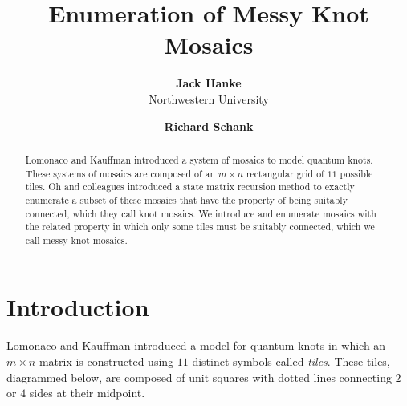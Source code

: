 \documentclass[12pt]{article}
\date{}
\author{
    \textbf{Jack Hanke}\\
    Northwestern University
    \and
    \textbf{Richard Schank}\\
    }
\title{\textbf{Enumeration of Messy Knot Mosaics}}
\theoremstyle{plain}
\theoremstyle{definition}
\theoremstyle{remark}
\theoremstyle{definition}
\newcommand{\cell}[4]{ \draw[thick] ( #1 , #2 ) rectangle ( #3 , #4 );}
\newcommand{\cellA}[4]{\draw[red, thick, densely dotted] ( #1 + 0.5 , #2 ) arc(0:90:{0.5}); \draw[thick] ( #1 , #2 ) rectangle ( #3 , #4 );}
\newcommand{\cellB}[4]{\draw[red, thick, densely dotted] ( #1 + 1 , #2 + 0.5 ) arc(90:180:{0.5}); \draw[thick] ( #1 , #2 ) rectangle ( #3 , #4 );}
\newcommand{\cellC}[4]{\draw[red, thick, densely dotted] ( #1 + 0.5, #2 + 1 ) arc(180:270:{0.5}); \draw[thick] ( #1 , #2 ) rectangle ( #3 , #4 );}
\newcommand{\cellD}[4]{\draw[red, thick, densely dotted] ( #1 , #2 + 0.5 ) arc(-90:0:{0.5}); \draw[thick] ( #1 , #2 ) rectangle ( #3 , #4 );}
\newcommand{\cellE}[4]{\draw[red, thick, densely dotted] (#3, #4 * 0.5 + #2 * 0.5) -- (#1, #4 * 0.5 + #2 * 0.5); \draw[thick] ( #1 , #2 ) rectangle ( #3 , #4 );}
\newcommand{\cellF}[4]{\draw[red, thick, densely dotted] (#3 * 0.5 + #1 * 0.5 , #2) -- (#3 * 0.5 + #1 * 0.5 , #4); \draw[thick] ( #1 , #2 ) rectangle ( #3 , #4 );}
\newcommand{\cellG}[4]{\draw[red, thick, densely dotted] ( #1 + 0.5 , #2 ) arc(0:90:{0.5}); \draw[red, thick, densely dotted] ( #1 + 0.5, #2 + 1 ) arc(180:270:{0.5}); \draw[thick] ( #1 , #2 ) rectangle ( #3 , #4 );}
\newcommand{\cellH}[4]{\draw[red, thick, densely dotted] ( #1 , #2 + 0.5 ) arc(-90:0:{0.5}); \draw[red, thick, densely dotted] ( #1 + 1 , #2 + 0.5 ) arc(90:180:{0.5}); \draw[thick] ( #1 , #2 ) rectangle ( #3 , #4 );}
\newcommand{\cellI}[4]{\draw[red, thick, densely dotted] (#3 * 0.5 + #1 * 0.5 , #2) -- (#3 * 0.5 + #1 * 0.5 , #4); \node[shape=circle,draw=none,fill=white, inner sep=3pt,minimum size=5pt] (A) at ( #1 + 0.5 , #2 + 0.5 ) {}; \draw[red, thick, densely dotted] (#3, #4 * 0.5 + #2 * 0.5) -- (#1, #4 * 0.5 + #2 * 0.5); \draw[thick] ( #1 , #2 ) rectangle ( #3 , #4 );}
\newcommand{\cellJ}[4]{\draw[red, thick, densely dotted] (#3, #4 * 0.5 + #2 * 0.5) -- (#1, #4 * 0.5 + #2 * 0.5); \node[shape=circle,draw=none,fill=white, inner sep=3pt,minimum size=5pt] (A) at ( #1 + 0.5 , #2 + 0.5 ) {}; \draw[thick] ( #1 , #2 ) rectangle ( #3 , #4 ); \draw[red, thick, densely dotted] (#3 * 0.5 + #1 * 0.5 , #2) -- (#3 * 0.5 + #1 * 0.5 , #4);}
\newcommand{\lablnode}[3]{\node[shape=circle,draw=none,fill=none, inner sep=0pt,minimum size=5pt] (A) at ( #1 , #2 ) {#3};}
\begin{document}
\maketitle

\begin{center}

    \begin{abstract}
        Lomonaco and Kauffman introduced a system of mosaics to model quantum knots. These systems of mosaics are composed of an $m \times n$ rectangular grid of $11$ possible tiles. Oh and colleagues introduced a state matrix recursion method to exactly enumerate a subset of these mosaics that have the property of being suitably connected, which they call knot mosaics. We introduce and enumerate mosaics with the related property in which only some tiles must be suitably connected, which we call messy knot mosaics.
    \end{abstract}

\end{center}

\section{Introduction}

Lomonaco and Kauffman \cite{Lomonaco08} introduced a model for quantum knots in which an $m \times n$ matrix is constructed using $11$ distinct symbols called \textit{tiles}. These tiles, diagrammed below, are composed of unit squares with dotted lines connecting $2$ or $4$ sides at their midpoint.

\begin{center}
\end{center}
\end{document}
